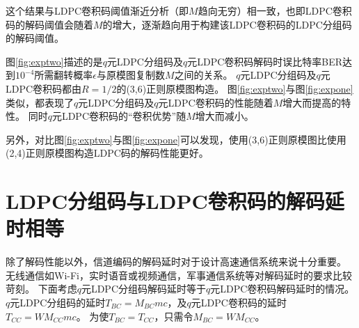 这个结果与LDPC卷积码阈值渐近分析（即$M$趋向无穷）相一致，也即LDPC卷积码的解码阈值会随着$M$的增大，逐渐趋向用于构建该LDPC卷积码的LDPC分组码的解码阈值。

\begin{center}
\pgfplotsset{compat=1.13}
\label{fig:exptwo}
\end{center}

图\ref{fig:exptwo}描述的是$q$元LDPC分组码及$q$元LDPC卷积码解码时误比特率BER达到$10^{-4}$所需翻转概率$\epsilon$与原模图复制数$M$之间的关系。
$q$元LDPC分组码及$q$元LDPC卷积码都由$R=1/2$的(3,6)正则原模图构造。
图\ref{fig:exptwo}与图\ref{fig:expone}类似，都表现了$q$元LDPC分组码及$q$元LDPC卷积码的性能随着$M$增大而提高的特性。
同时$q$元LDPC卷积码的“卷积优势”随$M$增大而减小。

另外，对比图\ref{fig:exptwo}与图\ref{fig:expone}可以发现，使用(3,6)正则原模图比使用(2,4)正则原模图构造LDPC码的解码性能更好。


\section{LDPC分组码与LDPC卷积码的解码延时相等}
除了解码性能以外，信道编码的解码延时对于设计高速通信系统来说十分重要。
无线通信如Wi-Fi，实时语音或视频通信，军事通信系统等对解码延时的要求比较苛刻。
下面考虑$q$元LDPC分组码解码延时等于$q$元LDPC卷积码解码延时的情况。
$q$元LDPC分组码的延时$T_{BC}=M_{BC}mc$，及$q$元LDPC卷积码的延时$T_{CC}=WM_{CC}mc$。
为使$T_{BC}=T_{CC}$，只需令$M_{BC} = WM_{CC}$。

